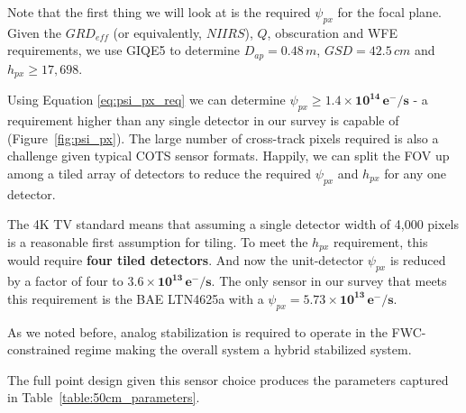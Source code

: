 \documentclass[10pt,journal]{IEEEtran}  %
\begin{document}
Note that the first thing we will look at is the required $\psi_{px}$ for the focal plane.  Given the $GRD_{eff}$ (or equivalently, $NIIRS$), $Q$, obscuration and WFE requirements, we use GIQE5 to determine $D_{ap} = 0.48 \, m$, $GSD = 42.5 \, cm$ and $h_{px} \geq 17,698$.

Using Equation \eqref{eq:psi_px_req} we can determine $\psi_{px} \geq \mathbf{1.4 \times 10^{14} \, e^- / s}$ - a requirement higher than any single detector in our survey is capable of (Figure~\ref{fig:psi_px}).  The large number of cross-track pixels required is also a challenge given typical COTS sensor formats.  Happily, we can split the FOV up among a tiled array of detectors to reduce the required $\psi_{px}$ and $h_{px}$ for any one detector.  

The 4K TV standard means that assuming a single detector width of 4,000 pixels is a reasonable first assumption for tiling.  To meet the $h_{px}$ requirement, this would require \textbf{four tiled detectors}.  And now the unit-detector $\psi_{px}$ is reduced by a factor of four to $\mathbf{3.6 \times 10^{13} \, e^-/s}$.  The only sensor in our survey that meets this requirement is the BAE LTN4625a with a $\psi_{px} = \mathbf{5.73 \times 10^{13} \, e^- / s}$.

As we noted before, analog stabilization is required to operate in the FWC-constrained regime making the overall system a hybrid stabilized system.

The full point design given this sensor choice produces the parameters captured in Table~\ref{table:50cm_parameters}.

\begin{table}[h!]
\centering
{}
\caption{Dependent system parameters for optimized 50cm system}
\label{table:50cm_parameters}
\end{table}
\end{document}
